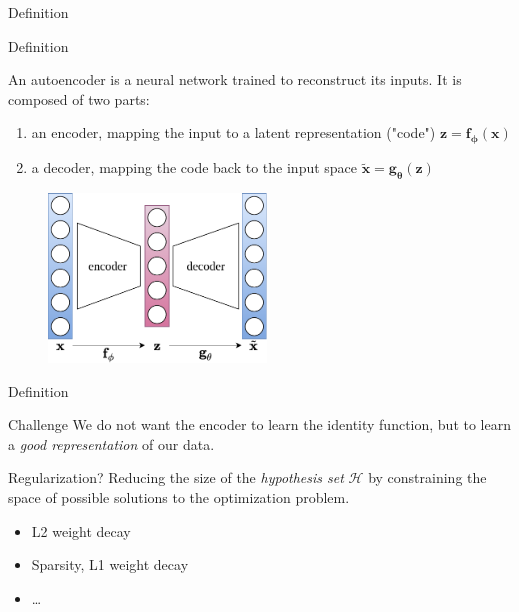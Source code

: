 \documentclass{beamer}
\begin{document}
  \begin{frame}{Definition}


    \begin{exampleblock}{Definition}
      \small{
      An \alert{autoencoder} is a neural network trained to reconstruct its inputs. It is composed of two parts:
      \vspace{-0.4cm}
      \begin{enumerate}
        \item an \alert{encoder}, mapping the input to a latent representation ("code") $\mathbf{z} = \mathbf{f}_{\boldsymbol{\phi}}(\mathbf{x})$
        \item a \alert{decoder}, mapping the code back to the input space $\tilde{\mathbf{x}} = \mathbf{g}_{\boldsymbol{\theta}}(\mathbf{z})$
      \end{enumerate}
      }
    \end{exampleblock}
    \vspace{-0.25cm}
    \begin{figure}
      \includegraphics[height=4.5cm]{rc/autoencoder}
    \end{figure}

  \end{frame}

  \begin{frame}{Definition}


    \begin{alertblock}{Challenge}
      We do not want the encoder to learn the identity function, but to learn a \emph{good representation} of our data.
    \end{alertblock}

    \vspace{0.5cm}

    \begin{block}{Regularization?}
      Reducing the size of the \emph{hypothesis set} $\mathcal{H}$ by constraining the space of possible solutions to the optimization problem.
      \vspace{-0.25cm}
      \begin{itemize}
        \item L2 weight decay
        \item Sparsity, L1 weight decay
        \item \dots
      \end{itemize}
    \end{block}
    
  \end{frame}
\end{document}
